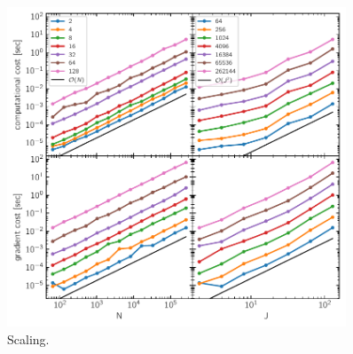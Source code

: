 \documentclass[rnaas]{aastex62}
\newcommand{\figurelabel}[1]{\label{fig:#1}}
\begin{document}
\begin{figure}[h!]
\begin{center}
\includegraphics[width=0.9\textwidth]{figure.pdf}
\caption{%
    Scaling.
\figurelabel{figure}}
\end{center}
\end{figure}



\end{document}
